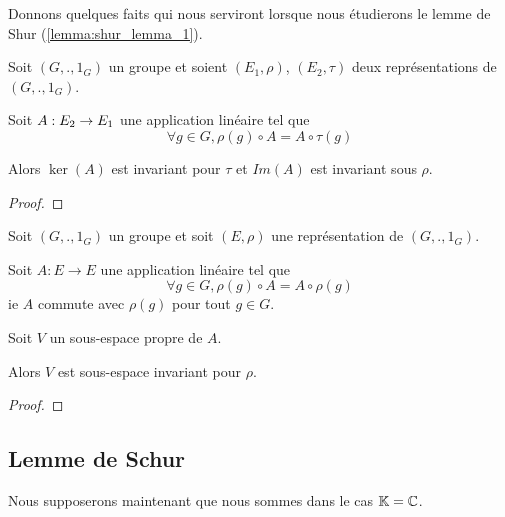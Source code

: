 Donnons quelques faits qui nous serviront lorsque nous étudierons le lemme de
Shur (\ref{lemma:shur_lemma_1}).

\begin{proposition}
	\label{prop:kernel_and_rank_invariant}
	Soit $(G, ., 1_{G})$ un groupe et soient $(E_{1},
	\rho)$,
	$(E_{2}, \tau)$
	deux représentations de $(G, ., 1_{G})$.

	Soit $A : E_{2} \rightarrow E_{1}$ une application linéaire tel
	que
	\begin{equation}
		\forall g \in G, \rho(g) \circ A = A \circ \tau(g)
	\end{equation}

	Alors $\ker{(A)}$ est invariant pour $\tau$ et $Im(A)$ est invariant sous
	$\rho$.
\end{proposition}

\ifdefined\outputproof
\begin{proof}

\end{proof}
\fi

\begin{proposition}
	\label{prop:commute_eigenspace}
	Soit $(G, ., 1_{G})$ un groupe et soit $(E, \rho)$ une
	représentation de $(G, ., 1_{G})$.

	Soit $A : E \rightarrow E$ une application linéaire tel que
	\begin{equation}
		\forall g \in G, \rho(g) \circ A = A \circ \rho(g)
	\end{equation}
	ie $A$ commute avec $\rho(g)$ pour tout $g \in G$.

	Soit $V$ un sous-espace propre de $A$.

	Alors $V$ est sous-espace invariant pour $\rho$.
\end{proposition}

\ifdefined\outputproof
\begin{proof}

\end{proof}
\fi


\subsection{Lemme de Schur}

Nous supposerons maintenant que nous sommes dans le cas $\mathbb{K} = \mathbb{C}$.

